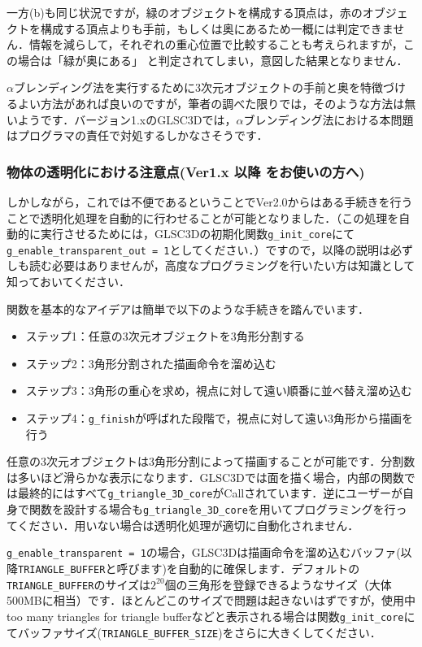 \documentclass[a4paper,12pt]{jsarticle}%
\begin{document}
一方(b)も同じ状況ですが，緑のオブジェクトを構成する頂点は，赤のオブジェクトを構成する頂点よりも手前，もしくは奥にあるため一概には判定できません．情報を減らして，それぞれの重心位置で比較することも考えられますが，この場合は「緑が奥にある」
と判定されてしまい，意図した結果となりません．

$\alpha$ブレンディング法を実行するために3次元オブジェクトの手前と奥を特徴づけるよい方法があれば良いのですが，筆者の調べた限りでは，そのような方法は無いようです．バージョン1.xのGLSC3Dでは，$\alpha$ブレンディング法における本問題はプログラマの責任で対処するしかなさそうです．

\subsubsection{物体の透明化における注意点(Ver1.x 以降 をお使いの方へ)}

しかしながら，これでは不便であるということでVer2.0からはある手続きを行うことで透明化処理を自動的に行わせることが可能となりました．（この処理を自動的に実行させるためには，GLSC3Dの初期化関数\verb|g_init_core|にて\verb|g_enable_transparent_out = 1|としてください．）ですので，以降の説明は必ずしも読む必要はありませんが，高度なプログラミングを行いたい方は知識として知っておいてください．

関数を基本的なアイデアは簡単で以下のような手続きを踏んでいます．
\begin{itemize}
\item ステップ1：任意の3次元オブジェクトを3角形分割する
\item ステップ2：3角形分割された描画命令を溜め込む
\item ステップ3：3角形の重心を求め，視点に対して遠い順番に並べ替え溜め込む
\item ステップ4：\verb|g_finish|が呼ばれた段階で，視点に対して遠い3角形から描画を行う
\end{itemize}


任意の3次元オブジェクトは3角形分割によって描画することが可能です．分割数は多いほど滑らかな表示になります．GLSC3Dでは面を描く場合，内部の関数では最終的にはすべて\verb|g_triangle_3D_core|がCallされています．逆にユーザーが自身で関数を設計する場合も\verb|g_triangle_3D_core|を用いてプログラミングを行ってください．用いない場合は透明化処理が適切に自動化されません．


\verb|g_enable_transparent = 1|の場合，GLSC3Dは描画命令を溜め込むバッファ(以降\verb|TRIANGLE_BUFFER|と呼びます)を自動的に確保します．デフォルトの\verb|TRIANGLE_BUFFER|のサイズは$2^{20}$個の三角形を登録できるようなサイズ（大体500MBに相当）です．ほとんどこのサイズで問題は起きないはずですが，使用中too many triangles for triangle bufferなどと表示される場合は関数\verb|g_init_core|にてバッファサイズ(\verb|TRIANGLE_BUFFER_SIZE|)をさらに大きくしてください．
\end{document}

